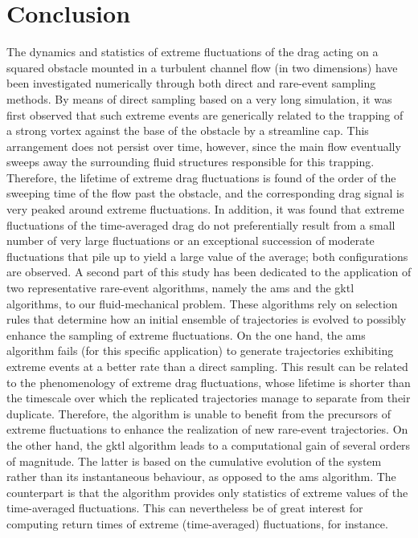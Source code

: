 \section{Conclusion}
\label{conlusion}
The dynamics and statistics of extreme fluctuations of the drag acting on a squared obstacle mounted in a turbulent channel flow (in two dimensions) have been investigated numerically through both direct and rare-event sampling methods. 
By means of direct sampling based on a very long simulation, it was first observed that such extreme events are generically related to the trapping of a strong vortex against the base of the obstacle by a streamline cap.
This arrangement does not persist over time, however, since the main flow eventually sweeps away the surrounding fluid structures responsible for this trapping. Therefore, the lifetime of extreme drag fluctuations is found of the order of the sweeping time of the flow past the obstacle, and the corresponding drag signal is very peaked around extreme fluctuations.
In addition, it was found that extreme fluctuations of the time-averaged drag do not preferentially result from a small number of very large fluctuations or an exceptional succession of moderate fluctuations that pile up to yield a large value of the average; both configurations are observed. 
A second part of this study has been dedicated to the application of two representative rare-event algorithms, namely the \acl{ams} and the \acl{gktl} algorithms, to our fluid-mechanical problem. These algorithms rely on selection rules that determine how an initial ensemble of trajectories is evolved to possibly enhance the sampling of extreme fluctuations. 
%
On the one hand, the \ac{ams} algorithm fails (for this specific application) to generate trajectories exhibiting extreme events at a better rate than a direct sampling. This result can be related to the phenomenology of extreme drag fluctuations, whose lifetime is shorter than the timescale over which the replicated trajectories manage to separate from their duplicate.
Therefore, the algorithm is unable to benefit from the precursors of extreme fluctuations to enhance the realization of new rare-event trajectories. 
%
On the other hand, the \ac{gktl} algorithm leads to a computational gain of several orders of magnitude. The latter is based on the cumulative evolution of the system rather than its instantaneous behaviour, as opposed to the \ac{ams} algorithm. The counterpart is that the algorithm provides only  statistics of extreme values of the time-averaged fluctuations. This can nevertheless be of great interest for computing return times of extreme (time-averaged) fluctuations, for instance.   

